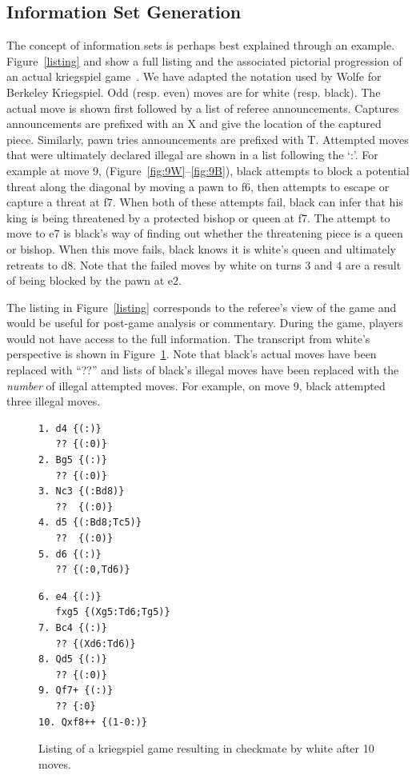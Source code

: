 \documentclass[times, 10pt,twocolumn]{article}
\begin{document}
\subsection{Information Set Generation}
The concept of information sets is perhaps best explained through an example. 
Figure~\ref{listing} and show a full listing and the associated pictorial progression of an actual
kriegspiel game~\cite{li94chess}.  We have adapted the notation used by Wolfe for Berkeley Kriegspiel.  Odd (resp. even) moves are for white (resp. black).  The actual move is shown
first followed by a list of referee announcements.  Captures announcements are prefixed with an X and give the location
of the captured piece.  Similarly, pawn tries announcements are prefixed with T.  Attempted moves that were ultimately
declared illegal are shown in a list following the `:'.  For example at move 9, (Figure~\ref{fig:9W}--\ref{fig:9B}),
black attempts to block a potential threat along the diagonal by moving a pawn to f6, then attempts to escape or capture
a threat at f7.  When both of these attempts fail, black can infer that his king is being threatened by a protected
bishop or queen at f7.  The attempt to move to e7 is black's way of finding out whether the threatening piece is a queen
or bishop.  When this move fails, black knows it is white's queen and ultimately retreats to d8.  Note that the failed
moves by white on turns 3 and 4 are a result of being blocked by the pawn at e2.


The listing in Figure~\ref{listing} corresponds to the referee's view of the game and would be useful for
post-game analysis or commentary.  During the game, players would not have access to the full information.  The
transcript from white's perspective is shown in Figure~\ref{filteredlisting}.  Note that black's actual moves have been
replaced with ``??'' and lists of black's illegal moves have been replaced with the {\em number} of illegal attempted
moves.  For example, on move 9, black attempted three illegal moves.
\begin{figure}
\begin{minipage}[b]{0.35\linewidth}
\centering
\small
\begin{verbatim}
1. d4 {(:)}
   ?? {(:0)}
2. Bg5 {(:)}
   ?? {(:0)}
3. Nc3 {(:Bd8)}
   ??  {(:0)}
4. d5 {(:Bd8;Tc5)}
   ??  {(:0)}
5. d6 {(:)}
   ?? {(:0,Td6)}
\end{verbatim}
\end{minipage}
\begin{minipage}[b]{0.25\linewidth}
\small
\centering
\begin{verbatim}
6. e4 {(:)}
   fxg5 {(Xg5:Td6;Tg5)}
7. Bc4 {(:)}
   ?? {(Xd6:Td6)}
8. Qd5 {(:)}
   ?? {(:0)}
9. Qf7+ {(:)} 
   ?? {:0}
10. Qxf8++ {(1-0:)}
\end{verbatim}
\end{minipage}
\caption{Listing of a kriegspiel game resulting in checkmate by white after 10 moves.}
\label{filteredlisting}
\end{figure}
\end{document}
